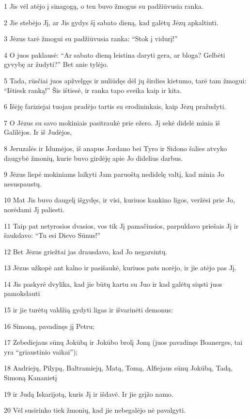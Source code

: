 \par 1 Jis vėl atėjo į sinagogą, o ten buvo žmogus su padžiūvusia ranka. 
\par 2 Jie stebėjo Jį, ar Jis gydys šį sabato dieną, kad galėtų Jėzų apkaltinti. 
\par 3 Jėzus tarė žmogui su padžiūvusia ranka: “Stok į vidurį!” 
\par 4 O juos paklausė: “Ar sabato dieną leistina daryti gera, ar bloga? Gelbėti gyvybę ar žudyti?” Bet anie tylėjo. 
\par 5 Tada, rūsčiai juos apžvelgęs ir nuliūdęs dėl jų širdies kietumo, tarė tam žmogui: “Ištiesk ranką!” Šis ištiesė, ir ranka tapo sveika kaip ir kita. 
\par 6 Išėję fariziejai tuojau pradėjo tartis su erodininkais, kaip Jėzų pražudyti. 
\par 7 O Jėzus su savo mokiniais pasitraukė prie ežero. Jį sekė didelė minia iš Galilėjos. Ir iš Judėjos, 
\par 8 Jeruzalės ir Idumėjos, iš anapus Jordano bei Tyro ir Sidono šalies atvyko daugybė žmonių, kurie buvo girdėję apie Jo didelius darbus. 
\par 9 Jėzus liepė mokiniams laikyti Jam paruoštą nedidelę valtį, kad minia Jo nesuspaustų. 
\par 10 Mat Jis buvo daugelį išgydęs, ir visi, kuriuos kankino ligos, veržėsi prie Jo, norėdami Jį paliesti. 
\par 11 Taip pat netyrosios dvasios, vos tik Jį pamačiusios, parpuldavo priešais Jį ir šaukdavo: “Tu esi Dievo Sūnus!” 
\par 12 Bet Jėzus griežtai jas drausdavo, kad Jo negarsintų. 
\par 13 Jėzus užkopė ant kalno ir pasišaukė, kuriuos pats norėjo, ir jie atėjo pas Jį. 
\par 14 Jis paskyrė dvylika, kad jie būtų kartu su Juo ir kad galėtų siųsti juos pamokslauti 
\par 15 ir jie turėtų valdžią gydyti ligas ir išvarinėti demonus: 
\par 16 Simoną, pavadinęs jį Petru; 
\par 17 Zebediejaus sūnų Jokūbą ir Jokūbo brolį Joną (juos pavadinęs Boanerges, tai yra “griaustinio vaikai”); 
\par 18 Andriejų, Pilypą, Baltramiejų, Matą, Tomą, Alfiejaus sūnų Jokūbą, Tadą, Simoną Kananietį 
\par 19 ir Judą Iskarijotą, kuris Jį ir išdavė. Ir jie grįžo namo. 
\par 20 Vėl susirinko tiek žmonių, kad jie nebegalėjo nė pavalgyti. 
